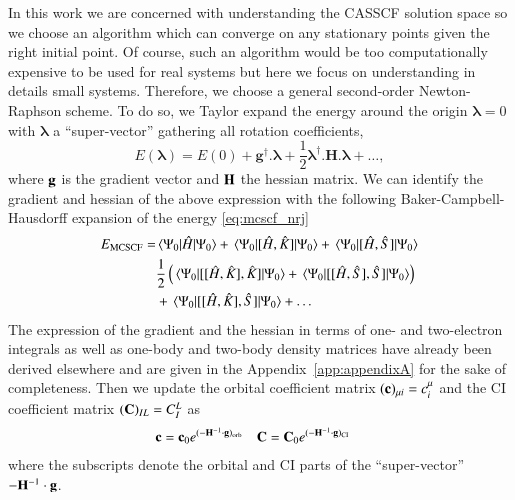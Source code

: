 \documentclass[aps,prb,reprint,showkeys,superscriptaddress]{revtex4-1}
\begin{document}
In this work we are concerned with understanding the CASSCF solution space so we choose an algorithm which can converge on any stationary points given the right initial point.
Of course, such an algorithm would be too computationally expensive to be used for real systems but here we focus on understanding in details small systems.
Therefore, we choose a general second-order Newton-Raphson scheme. \cite{Olsen_1983}
To do so, we Taylor expand the energy around the origin $\bm{\lambda}=0$ with $\bm{\lambda}$ a ``super-vector'' gathering all rotation coefficients,
\begin{equation}
  \label{eq:mcscf_nrj_taylor}
  E(\bm{\lambda}) = E(0) + \boldsymbol{g}^\dagger.\bm{\lambda} + \frac{1}{2} \bm{\lambda}^\dagger.\boldsymbol{H}.\bm{\lambda} + \dots,
\end{equation}
where $\vb{g}$ is the gradient vector and $\vb{H}$ the hessian matrix.
We can identify the gradient and hessian of the above expression with the following Baker-Campbell-Hausdorff expansion of the energy \eqref{eq:mcscf_nrj}
\begin{equation}
  \label{eq:mcscf_nrj_bch}
  \begin{split}
    E_{\text{MCSCF}} = &\mel{\Psi_0}{\Hat{H}}{\Psi_0} + \mel{\Psi_0}{[\Hat{H},\Hat{K}]}{\Psi_0} + \mel{\Psi_0}{[\Hat{H},\Hat{S}]}{\Psi_0}  \\
    &\frac{1}{2} \left(\mel{\Psi_0}{[[\Hat{H},\Hat{K}],\Hat{K}]}{\Psi_0}+ \mel{\Psi_0}{[[\Hat{H},\Hat{S}],\Hat{S}]}{\Psi_0}\right) \\
    &+ \mel{\Psi_0}{[[\Hat{H},\Hat{K}],\Hat{S}]}{\Psi_0} + \dots
  \end{split}
\end{equation}
The expression of the gradient and the hessian in terms of one- and two-electron integrals as well as one-body and two-body density matrices have already been derived elsewhere \cite{Olsen_1983} and are given in the Appendix~\ref{app:appendixA} for the sake of completeness.
Then we update the orbital coefficient matrix $(\vb{c})_{\mu i} = c_i^\mu$ and the CI coefficient matrix $(\vb{C})_{IL} = C_I^L$ as
\begin{align}
  \vb{c} &= \vb{c}_0 e^{(-\vb{H}^{-1}\cdot \vb{g})_{\text{orb}}} & \vb{C} &= \vb{C}_0 e^{(-\vb{H}^{-1}\cdot \vb{g})_{\text{CI}}}
\end{align}
where the subscripts denote the orbital and CI parts of the ``super-vector'' $-\vb{H}^{-1}\cdot \vb{g}$.
\end{document}
